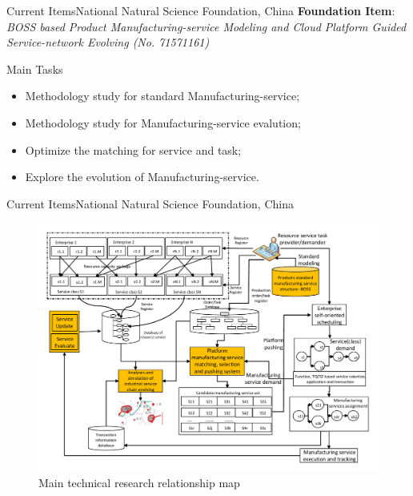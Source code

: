 \begin{frame}{Current Items}{National Natural Science Foundation, China}
\textbf{Foundation Item}: \textit{BOSS based Product Manufacturing-service Modeling and Cloud Platform Guided Service-network Evolving (No. 71571161)}
\begin{block}{Main Tasks}
\begin{itemize}
\item Methodology study for standard Manufacturing-service;
\item Methodology study for Manufacturing-service evalution;
\item Optimize the matching for service and task;
\item Explore the evolution of Manufacturing-service.
\end{itemize}
\end{block}
\end{frame}
\begin{frame}{Current Items}{National Natural Science Foundation, China}
	\begin{figure}
		\centering
		\includegraphics[height=0.85\textheight]{figures/nsf.pdf}
		\caption{Main technical research relationship map}	
	\end{figure}
\end{frame}